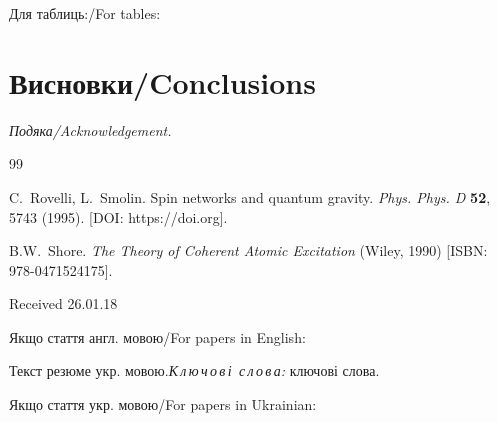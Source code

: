 \documentclass[fleqn,twoside,twocolumn,nofootinbib,showkeys]{revtex4} %
\begin{document}
Для таблиць:/For tables:%

\begin{table}[b]
\noindent\caption{Назва таблиці/Table title}\vskip3mm

\end{table}

\section{Висновки/Conclusions}

\vskip3mm \textit{Подяка/Acknowledgement.}

\begin{thebibliography}{99}

 C.~Rovelli, L.~Smolin. Spin networks and quantum
gravity. \textit{Phys. Phys. D}  {\bf 52}, 5743 (1995). [DOI: https://doi.org].%

 B.W.~Shore. \textit{The Theory of Coherent Atomic Excitation}
(Wiley,  1990) [ISBN: 978-0471524175].%


\begin{flushright}
{\footnotesize Received 26.01.18}
\end{flushright}
\end{thebibliography}

Якщо стаття англ. мовою/For papers in English:

\vspace*{-5mm} {Текст резюме укр. мовою.}{\textit{К\,л\,ю\,ч\,о\,в\,і\,
с\,л\,о\,в\,а:} ключові слова.}

Якщо стаття укр. мовою/For papers in Ukrainian:

\end{document}
